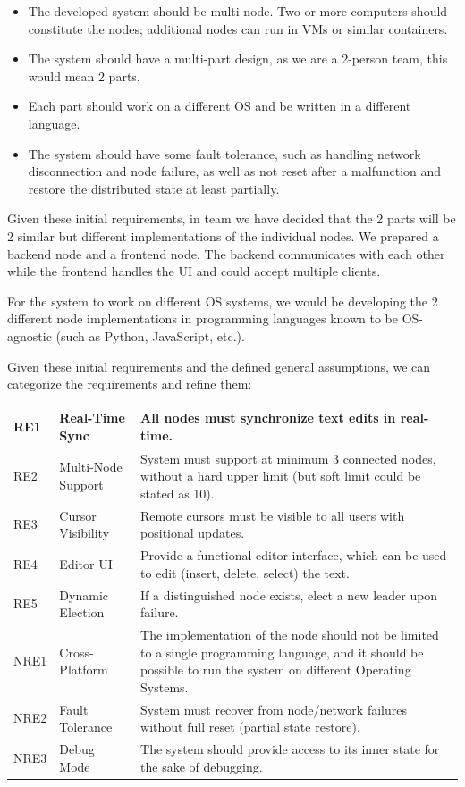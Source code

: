 \documentclass[12pt,a4paper]{article}
\renewcommand\_{\textunderscore\allowbreak}
\begin{document}
\begin{itemize}
\item The developed system should be multi-node. Two or more computers should constitute the nodes; additional nodes can run in VMs or similar containers.\\
\item The system should have a multi-part design, as we are a 2-person team, this would mean 2 parts.\\
\item Each part should work on a different OS and be written in a different language.\\
\item The system should have some fault tolerance, such as handling network disconnection and node failure, as well as not reset after a malfunction and restore the distributed state at least partially.\\
\end{itemize}


Given these initial requirements, in team we have decided that the 2 parts will be 2 similar but different implementations of the individual nodes. We prepared a backend node and a frontend node. The backend communicates with each other while the frontend handles the UI and could accept multiple clients.

For the system to work on different OS systems, we would be developing the 2 different node implementations in programming languages known to be OS-agnostic (such as Python, JavaScript, etc.).

Given these initial requirements and the defined general assumptions, we can categorize the requirements and refine them:
\begin{tabularx}{\textwidth}{|l|l|X|}
\hline
RE1 & Real-Time Sync & All nodes must synchronize text edits in real-time. \\
\hline
RE2 & Multi-Node Support & System must support at minimum 3 connected nodes, without a hard upper limit (but soft limit could be stated as 10). \\
\hline
RE3 & Cursor Visibility & Remote cursors must be visible to all users with positional updates. \\
\hline
RE4 & Editor UI & Provide a functional editor interface, which can be used to edit (insert, delete, select) the text. \\
\hline
RE5 & Dynamic Election & If a distinguished node exists, elect a new leader upon failure. \\
\hline
NRE1 & Cross-Platform & The implementation of the node should not be limited to a single programming language, and it should be possible to run the system on different Operating Systems. \\
\hline
NRE2 & Fault Tolerance & System must recover from node/network failures without full reset (partial state restore). \\
\hline
NRE3 & Debug Mode & The system should provide access to its inner state for the sake of debugging. \\
\hline
\end{tabularx}
\newpage
\end{document}
